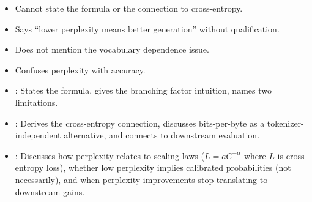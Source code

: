 \begin{interviewq}
\redflags
\begin{itemize}
    \item Cannot state the formula or the connection to cross-entropy.
    \item Says ``lower perplexity means better generation'' without qualification.
    \item Does not mention the vocabulary dependence issue.
    \item Confuses perplexity with accuracy.
\end{itemize}


\goodgreat
\begin{itemize}
    \item {}: States the formula, gives the branching factor
          intuition, names two limitations.
    \item {}: Derives the cross-entropy connection, discusses
          bits-per-byte as a tokenizer-independent alternative, and connects
          to downstream evaluation.
    \item {}: Discusses how perplexity relates to scaling laws
          ($L = aC^{-\alpha}$ where $L$ is cross-entropy loss), whether
          low perplexity implies calibrated probabilities (not necessarily),
          and when perplexity improvements stop translating to downstream gains.
\end{itemize}

\end{interviewq}

\vspace{0.5em}

